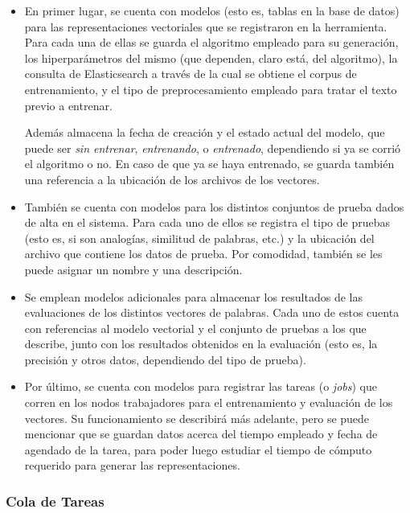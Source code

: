 \begin{itemize}

\item En primer lugar, se cuenta con modelos (esto es, tablas en la base de datos) para las
representaciones vectoriales que se registraron en la herramienta. Para cada una de ellas se guarda
el algoritmo empleado para su generación, los hiperparámetros del mismo (que dependen, claro está,
del algoritmo), la consulta de Elasticsearch a través de la cual se obtiene el corpus de
entrenamiento, y el tipo de preprocesamiento empleado para tratar el texto previo a entrenar.

Además almacena la fecha de creación y el estado actual del modelo, que puede ser \textit{sin
entrenar}, \textit{entrenando}, o \textit{entrenado}, dependiendo si ya se corrió el algoritmo o
no. En caso de que ya se haya entrenado, se guarda también una referencia a la ubicación de los
archivos de los vectores.

\item También se cuenta con modelos para los distintos conjuntos de prueba dados de alta en el
sistema. Para cada uno de ellos se registra el tipo de pruebas (esto es, si son analogías, similitud
de palabras, etc.) y la ubicación del archivo que contiene los datos de prueba. Por comodidad,
también se les puede asignar un nombre y una descripción.

\item Se emplean modelos adicionales para almacenar los resultados de las evaluaciones de los
distintos vectores de palabras. Cada uno de estos cuenta con referencias al modelo vectorial y el
conjunto de pruebas a los que describe, junto con los resultados obtenidos en la evaluación (esto
es, la precisión y otros datos, dependiendo del tipo de prueba).

\item Por último, se cuenta con modelos para registrar las tareas (o \textit{jobs}) que corren en
los nodos trabajadores para el entrenamiento y evaluación de los vectores. Su funcionamiento se
describirá más adelante, pero se puede mencionar que se guardan datos acerca del tiempo empleado y
fecha de agendado de la tarea, para poder luego estudiar el tiempo de cómputo requerido para generar
las representaciones.

\end{itemize}


\subsubsection{Cola de Tareas}

